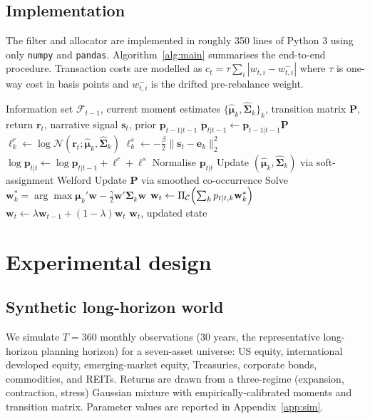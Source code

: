 \documentclass[review,12pt,authoryear]{elsarticle}
\begin{document}
\subsection{Implementation}
The filter and allocator are implemented in roughly 350 lines of Python 3 using only
\texttt{numpy} and \texttt{pandas}. Algorithm~\ref{alg:main} summarises the end-to-end
procedure. Transaction costs are modelled as $c_{t} = \tau \sum_i |w_{t,i} - w_{t,i}^{-}|$
where $\tau$ is one-way cost in basis points and $w_{t,i}^{-}$ is the drifted pre-rebalance
weight.

\begin{algorithm}[t]
\caption{Narrative Regimes -- one rebalancing step}
\label{alg:main}
\begin{algorithmic}[1]
\Require Information set $\mathcal{F}_{t-1}$, current moment estimates
$\{\hat{\boldsymbol{\mu}}_k,\hat{\boldsymbol{\Sigma}}_k\}_k$, transition matrix $\mathbf{P}$,
return $\mathbf{r}_t$, narrative signal $\mathbf{s}_t$, prior
$\mathbf{p}_{t-1|t-1}$
\State $\mathbf{p}_{t|t-1} \gets \mathbf{p}_{t-1|t-1}\mathbf{P}$ 
\State $\ell^r_k \gets \log \mathcal{N}(\mathbf{r}_t; \hat{\boldsymbol{\mu}}_k,\hat{\boldsymbol{\Sigma}}_k)$
\State $\ell^s_k \gets -\tfrac{\beta}{2}\|\mathbf{s}_t - \mathbf{e}_k\|_2^2$
\EndFor
\State $\log \mathbf{p}_{t|t} \gets \log \mathbf{p}_{t|t-1} + \boldsymbol{\ell}^r + \boldsymbol{\ell}^s$
\State Normalise $\mathbf{p}_{t|t}$
\State Update $(\hat{\boldsymbol{\mu}}_k,\hat{\boldsymbol{\Sigma}}_k)$ via soft-assignment Welford
\State Update $\mathbf{P}$ via smoothed co-occurrence
\State Solve $\mathbf{w}_k^* = \arg\max \boldsymbol{\mu}_k'\mathbf{w} -
\tfrac{\gamma}{2}\mathbf{w}'\boldsymbol{\Sigma}_k\mathbf{w}$
\EndFor
\State $\mathbf{w}_t \gets \Pi_{\mathcal{C}}\Bigl(\sum_k p_{t|t,k}\mathbf{w}_k^*\Bigr)$
\State $\mathbf{w}_t \gets \lambda \mathbf{w}_{t-1} + (1-\lambda) \mathbf{w}_t$
\State \Return $\mathbf{w}_t$, updated state
\end{algorithmic}
\end{algorithm}

\section{Experimental design}
\label{sec:experiments}

\subsection{Synthetic long-horizon world}
We simulate $T=360$ monthly observations (30 years, the representative long-horizon
planning horizon) for a seven-asset universe: US equity, international developed equity,
emerging-market equity, Treasuries, corporate bonds, commodities, and REITs. Returns are
drawn from a three-regime (expansion, contraction, stress) Gaussian mixture with
empirically-calibrated moments and transition matrix. Parameter values are reported in
Appendix~\ref{app:sim}.
\end{document}
